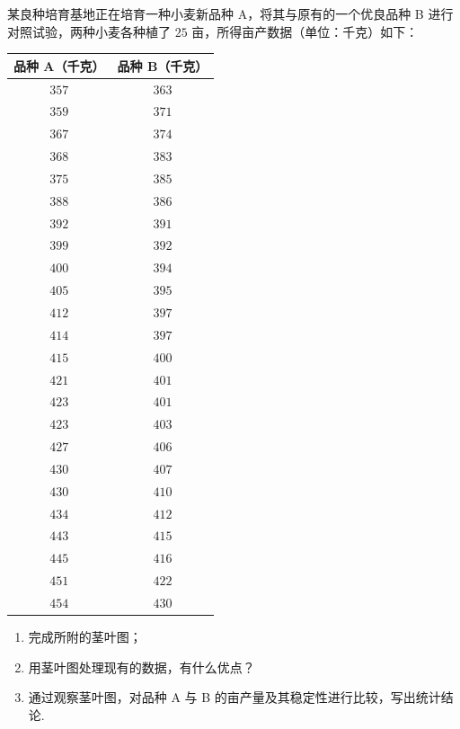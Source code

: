 \begin{problem}
某良种培育基地正在培育一种小麦新品种 A，将其与原有的一个优良品种 B 进行对照试验，两种小麦各种植了 \(25\) 亩，所得亩产数据（单位：千克）如下：

\begin{center}
\begin{tabular}{c|c}
品种 A（千克） & 品种 B（千克） \\
\hline
\(357\) & \(363\) \\
\(359\) & \(371\) \\
\(367\) & \(374\) \\
\(368\) & \(383\) \\
\(375\) & \(385\) \\
\(388\) & \(386\) \\
\(392\) & \(391\) \\
\(399\) & \(392\) \\
\(400\) & \(394\) \\
\(405\) & \(395\) \\
\(412\) & \(397\) \\
\(414\) & \(397\) \\
\(415\) & \(400\) \\
\(421\) & \(401\) \\
\(423\) & \(401\) \\
\(423\) & \(403\) \\
\(427\) & \(406\) \\
\(430\) & \(407\) \\
\(430\) & \(410\) \\
\(434\) & \(412\) \\
\(443\) & \(415\) \\
\(445\) & \(416\) \\
\(451\) & \(422\) \\
\(454\) & \(430\) \\
\end{tabular}
\end{center}

\begin{enumerate}
\item 完成所附的茎叶图；
\item 用茎叶图处理现有的数据，有什么优点？
\item 通过观察茎叶图，对品种 A 与 B 的亩产量及其稳定性进行比较，写出统计结论.
\end{enumerate}


\end{problem}
